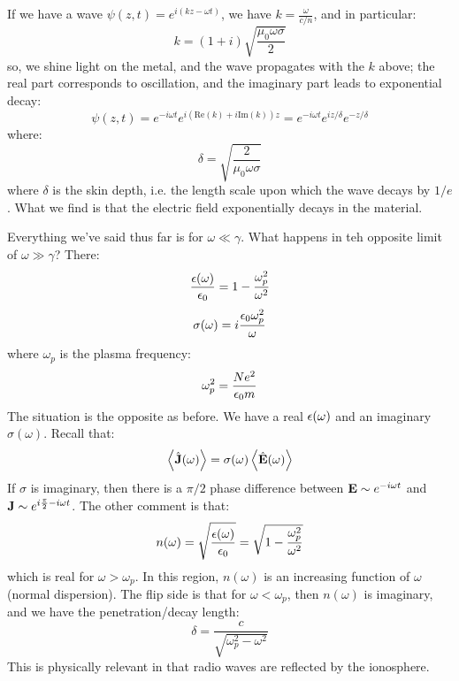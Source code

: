 \begin{itemize}
    If we have a wave $\psi(z, t) = e^{i(kz - \omega t)}$, we have $k = \frac{\omega}{c/n}$, and in particular:
    \begin{equation}
        k = (1+i)\sqrt{\frac{\mu_0 \omega\sigma}{2}}
    \end{equation}
    so, we shine light on the metal, and the wave propagates with the $k$ above; the real part corresponds to oscillation, and the imaginary part leads to exponential decay:
    \begin{equation}
        \psi(z, t) = e^{-i\omega t}e^{i(\text{Re}(k) + i\text{Im}(k))z} = e^{-i\omega t}e^{iz/\delta}e^{-z/\delta}
    \end{equation}
    where:
    \begin{equation}
        \delta = \sqrt{\frac{2}{\mu_0\omega\sigma}}
    \end{equation}
    where $\delta$ is the skin depth, i.e. the length scale upon which the wave decays by $1/e$. What we find is that the electric field exponentially decays in the material.

    Everything we've said thus far is for $\omega \ll \gamma$. What happens in teh opposite limit of $\omega \gg \gamma$? There:
    \begin{equation}
        \frac{\epsilon(\omega)}{\epsilon_0} = 1 - \frac{\omega_p^2}{\omega^2}
    \end{equation}
    \begin{equation}
        \sigma(\omega) = i\frac{\epsilon_0\omega_p^2}{\omega}
    \end{equation}
    where $\omega_p$ is the plasma frequency:
    \begin{equation}
        \omega_p^2 = \frac{Ne^2}{\epsilon_0 m}
    \end{equation}
    The situation is the opposite as before. We have a real $\epsilon(\omega)$ and an imaginary $\sigma(\omega)$. Recall that:
    \begin{equation}
        \left< \hat{\mathbf{J}}(\omega) \right> = \sigma(\omega)\left< \hat{\mathbf{E}}(\omega) \right>
    \end{equation}
    If $\sigma$ is imaginary, then there is a $\pi/2$ phase difference between $\mathbf{E} \sim e^{-i\omega t}$ and $\mathbf{J} \sim e^{i\frac{\pi}{2} - i\omega t}$. The other comment is that:
    \begin{equation}
        n(\omega) = \sqrt{\frac{\epsilon(\omega)}{\epsilon_0}} = \sqrt{1 - \frac{\omega_p^2}{\omega^2}}
    \end{equation}
    which is real for $\omega > \omega_p$. In this region, $n(\omega)$ is an increasing function of $\omega$ (normal dispersion). The flip side is that for $\omega < \omega_p$, then $n(\omega)$ is imaginary, and we have the penetration/decay length:
    \begin{equation}
        \delta = \frac{c}{\sqrt{\omega_p^2 - \omega^2}}
    \end{equation}
    This is physically relevant in that radio waves are reflected by the ionosphere.
\end{itemize}


